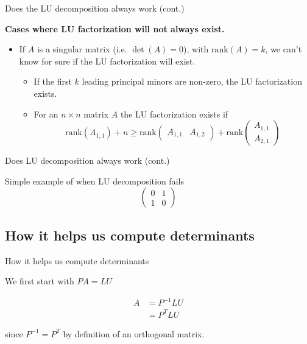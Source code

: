 \documentclass{beamer}
\begin{document}
\begin{frame}{Does the LU decomposition always work (cont.)}

    \textbf{Cases where LU factorization will not always exist.}
    \begin{itemize}
        \item If $A$ is a singular matrix (i.e. $\det(A) = 0$), with $\text{rank}(A)=k$, we can't know for
            sure if the LU factorization will exist.

            \begin{itemize}
                \item If the first $k$ leading principal minors are non-zero, the LU factorization
                    exists.
                \item For an $n \times n$ matrix $A$ the LU factorization exists if
                    \[
                        \text{rank}(A_{1,1}) + n \geq \text{rank}
                        \begin{pmatrix}
                            A_{1,1} & A_{1,2}
                        \end{pmatrix}
                        + \text{rank}
                        \begin{pmatrix}
                            A_{1,1} \\ A_{2,1}
                        \end{pmatrix}
                    \]
            \end{itemize}

    \end{itemize}

\end{frame}

\begin{frame}{Does LU decomposition always work (cont.)}

    Simple example of when LU decomposition fails
    \[
        \begin{pmatrix}
            0 & 1\\ 1 & 0
        \end{pmatrix}
    \]

\end{frame}

\subsection{How it helps us compute determinants}

\begin{frame}{How it helps us compute determinants}

    We first start with $PA = LU$

    \begin{align*}
        A &= P^{-1}LU \\
          &= P^T LU
    \end{align*}

    since $P^{-1} = P^T$ by definition of an orthogonal matrix.

\end{frame}
\end{document}
